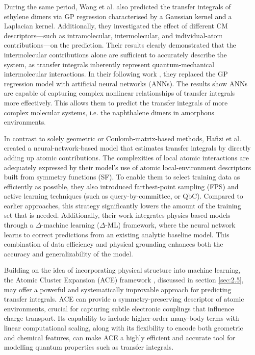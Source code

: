 During the same period, Wang et al.\cite{Wang2019} also predicted the transfer integrals of ethylene dimers via GP regression characterised by a Gaussian kernel and a Laplacian kernel.
Additionally, they investigated the effect of different CM descriptors—such as intramolecular, intermolecular, and individual-atom contributions—on the prediction.
Their results clearly demonstrated that the intermolecular contributions alone are sufficient to accurately describe the system, as transfer integrals inherently represent quantum-mechanical intermolecular interactions.
In their following work \cite{Wang2020}, they replaced the GP regression model with artificial neural networks (ANNs).
The results show ANNs are capable of capturing complex nonlinear relationships of transfer integrals more effectively.
This allows them to predict the transfer integrals of more complex molecular systems, i.e. the naphthalene dimers in amorphous environments.

In contrast to solely geometric or Coulomb-matrix-based methods, Hafizi et al. \cite{Hafizi2023} created a neural-network-based model that estimates transfer integrals by directly adding up atomic contributions.
The complexities of local atomic interactions are adequately expressed by their model's use of atomic local-environment descriptors built from symmetry functions (SF).
To enable them to select training data as efficiently as possible, they also introduced farthest-point sampling (FPS) and active learning techniques (such as query-by-committee, or QbC).
Compared to earlier approaches, this strategy significantly lowers the amount of the training set that is needed.
Additionally, their work integrates physics-based models through a $\Delta$-machine learning ($\Delta$-ML) framework, where the neural network learns to correct predictions from an existing analytic baseline model.
This combination of data efficiency and physical grounding enhances both the accuracy and generalizability of the model.

Building on the idea of incorporating physical structure into machine learning, the Atomic Cluster Expansion (ACE) framework \cite{Drautz2019,Dusson2022,Witt2023}, discussed in section \ref{sec:2.5}, may offer a powerful and systematically improvable approach for predicting transfer integrals.
ACE can provide a symmetry-preserving descriptor of atomic environments, crucial for capturing subtle electronic couplings that influence charge transport.
Its capability to include higher-order many-body terms with linear computational scaling, along with its flexibility to encode both geometric and chemical features, can make ACE a highly efficient and accurate tool for modelling quantum properties such as transfer integrals.

